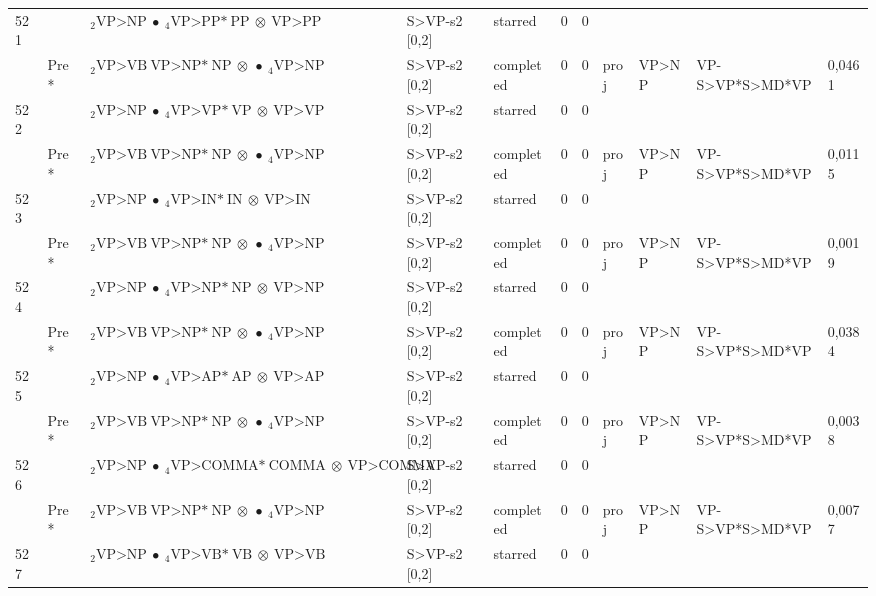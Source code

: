 \documentclass[10pt]{article}
\begin{document}
\begin{longtable}[htbp]{lllllllllll}
521 & & $ {}_2 \textrm{VP>NP} \  \bullet \ {}_{4} \textrm{VP>PP*} \ \textrm{PP} \  \otimes \ \textrm{VP>PP} $ & S>VP-s2 [0,2] & starred & 0 & 0 & & & & \\ 
 & Pre *& $ {}_2 \textrm{VP>VB} \ \textrm{VP>NP*} \ \textrm{NP} \  \otimes \  \bullet \ {}_{4} \textrm{VP>NP} $ & S>VP-s2 [0,2] & completed & 0 & 0 & proj & VP>NP & VP-S>VP*S>MD*VP & 0,0461 \\ 
522 & & $ {}_2 \textrm{VP>NP} \  \bullet \ {}_{4} \textrm{VP>VP*} \ \textrm{VP} \  \otimes \ \textrm{VP>VP} $ & S>VP-s2 [0,2] & starred & 0 & 0 & & & & \\ 
 & Pre *& $ {}_2 \textrm{VP>VB} \ \textrm{VP>NP*} \ \textrm{NP} \  \otimes \  \bullet \ {}_{4} \textrm{VP>NP} $ & S>VP-s2 [0,2] & completed & 0 & 0 & proj & VP>NP & VP-S>VP*S>MD*VP & 0,0115 \\ 
523 & & $ {}_2 \textrm{VP>NP} \  \bullet \ {}_{4} \textrm{VP>IN*} \ \textrm{IN} \  \otimes \ \textrm{VP>IN} $ & S>VP-s2 [0,2] & starred & 0 & 0 & & & & \\ 
 & Pre *& $ {}_2 \textrm{VP>VB} \ \textrm{VP>NP*} \ \textrm{NP} \  \otimes \  \bullet \ {}_{4} \textrm{VP>NP} $ & S>VP-s2 [0,2] & completed & 0 & 0 & proj & VP>NP & VP-S>VP*S>MD*VP & 0,0019 \\ 
524 & & $ {}_2 \textrm{VP>NP} \  \bullet \ {}_{4} \textrm{VP>NP*} \ \textrm{NP} \  \otimes \ \textrm{VP>NP} $ & S>VP-s2 [0,2] & starred & 0 & 0 & & & & \\ 
 & Pre *& $ {}_2 \textrm{VP>VB} \ \textrm{VP>NP*} \ \textrm{NP} \  \otimes \  \bullet \ {}_{4} \textrm{VP>NP} $ & S>VP-s2 [0,2] & completed & 0 & 0 & proj & VP>NP & VP-S>VP*S>MD*VP & 0,0384 \\ 
525 & & $ {}_2 \textrm{VP>NP} \  \bullet \ {}_{4} \textrm{VP>AP*} \ \textrm{AP} \  \otimes \ \textrm{VP>AP} $ & S>VP-s2 [0,2] & starred & 0 & 0 & & & & \\ 
 & Pre *& $ {}_2 \textrm{VP>VB} \ \textrm{VP>NP*} \ \textrm{NP} \  \otimes \  \bullet \ {}_{4} \textrm{VP>NP} $ & S>VP-s2 [0,2] & completed & 0 & 0 & proj & VP>NP & VP-S>VP*S>MD*VP & 0,0038 \\ 
526 & & $ {}_2 \textrm{VP>NP} \  \bullet \ {}_{4} \textrm{VP>COMMA*} \ \textrm{COMMA} \  \otimes \ \textrm{VP>COMMA} $ & S>VP-s2 [0,2] & starred & 0 & 0 & & & & \\ 
 & Pre *& $ {}_2 \textrm{VP>VB} \ \textrm{VP>NP*} \ \textrm{NP} \  \otimes \  \bullet \ {}_{4} \textrm{VP>NP} $ & S>VP-s2 [0,2] & completed & 0 & 0 & proj & VP>NP & VP-S>VP*S>MD*VP & 0,0077 \\ 
527 & & $ {}_2 \textrm{VP>NP} \  \bullet \ {}_{4} \textrm{VP>VB*} \ \textrm{VB} \  \otimes \ \textrm{VP>VB} $ & S>VP-s2 [0,2] & starred & 0 & 0 & & & & \\ 

\end{longtable}
\end{document}
